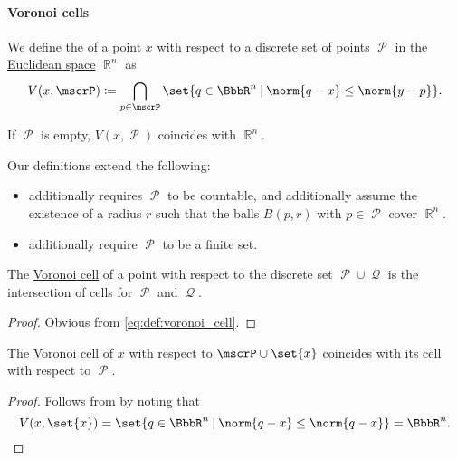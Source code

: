\paragraph{Voronoi cells}

\begin{definition}\label{def:voronoi_cell}
  We define the  of a point \( x \) with respect to a \hyperref[def:discrete_set]{discrete} set of points \( \mscrP \) in the \hyperref[def:euclidean_space]{Euclidean space} \( \BbbR^n \) as
  \begin{equation}\label{eq:def:voronoi_cell}
    V(x, \mscrP) \coloneqq \bigcap_{p \in \mscrP} \set{ q \in \BbbR^n \given \norm{ q - x } \leq \norm{ y - p } }.
  \end{equation}

  If \( \mscrP \) is empty, \( V(x, \mscrP) \) coincides with \( \BbbR^n \).
\end{definition}
\begin{comments}
  \item Our definitions extend the following:
  \begin{itemize}
    \item {} additionally requires \( \mscrP \) to be countable, and additionally assume the existence of a radius \( r \) such that the balls \( B(p, r) \) with \( p \in \mscrP \) cover \( \BbbR^n \).

    \item {} additionally require \( \mscrP \) to be a finite set.
  \end{itemize}
\end{comments}

\begin{proposition}\label{thm:voronoi_cell_union}
  The \hyperref[def:voronoi_cell]{Voronoi cell} of a point with respect to the discrete set \( \mscrP \cup \mscrQ \) is the intersection of cells for \( \mscrP \) and \( \mscrQ \).
\end{proposition}
\begin{proof}
  Obvious from \eqref{eq:def:voronoi_cell}.
\end{proof}

\begin{corollary}\label{thm:voronoi_cell_self}
  The \hyperref[def:voronoi_cell]{Voronoi cell} of \( x \) with respect to \( \mscrP \cup \set{ x } \) coincides with its cell with respect to \( \mscrP \).
\end{corollary}
\begin{proof}
  Follows from  by noting that
  \begin{equation*}
    V(x, \set{ x }) = \set{ q \in \BbbR^n \given \norm{ q - x } \leq \norm{ q - x } } = \BbbR^n.
  \end{equation*}
\end{proof}

